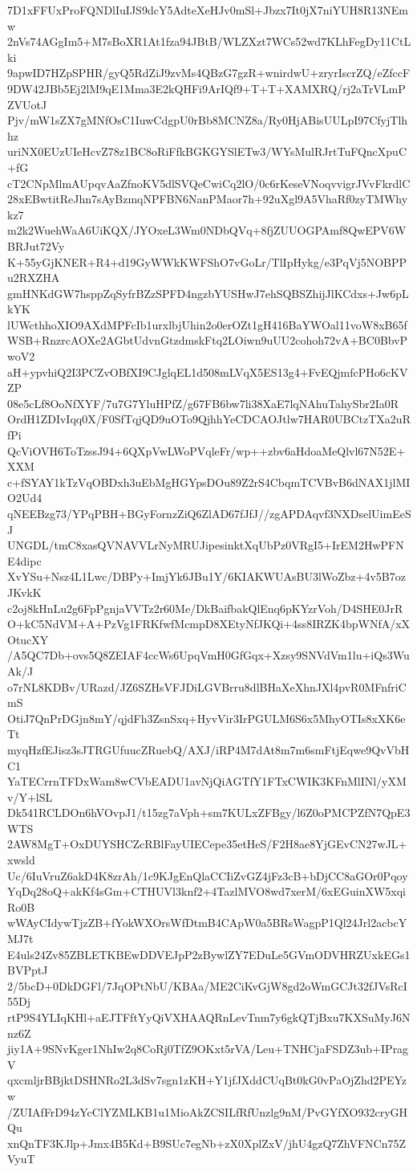 7D1xFFUxProFQNDlIuIJS9dcY5AdteXeHJv0mSl+Jbzx7It0jX7niYUH8R13NEmw
2nVs74AGgIm5+M7sBoXR1At1fza94JBtB/WLZXzt7WCs52wd7KLhFegDy11CtLki
9apwID7HZpSPHR/gyQ5RdZiJ9zvMs4QBzG7gzR+wnirdwU+zryrIscrZQ/eZfccF
9DW42JBb5Ej2lM9qE1Mma3E2kQHFi9ArIQf9+T+T+XAMXRQ/rj2aTrVLmPZVUotJ
Pjv/mW1sZX7gMNfOsC1IuwCdgpU0rBb8MCNZ8a/Ry0HjABisUULpI97CfyjTlhhz
uriNX0EUzUIeHcvZ78z1BC8oRiFfkBGKGYSlETw3/WYsMulRJrtTuFQncXpuC+fG
cT2CNpMlmAUpqvAaZfnoKV5dlSVQeCwiCq2lO/0c6rKeseVNoqvvigrJVvFkrdlC
28xEBwtitReJhn7sAyBzmqNPFBN6NanPMaor7h+92uXgl9A5VhaRf0zyTMWhykz7
m2k2WuehWaA6UiKQX/JYOxeL3Wm0NDbQVq+8fjZUUOGPAmf8QwEPV6WBRJut72Vy
K+55yGjKNER+R4+d19GyWWkKWFShO7vGoLr/TlIpHykg/e3PqVj5NOBPPu2RXZHA
gmHNKdGW7hsppZqSyfrBZzSPFD4ngzbYUSHwJ7ehSQBSZhijJlKCdxs+Jw6pLkYK
lUWcthhoXIO9AXdMPFcIb1urxlbjUhin2o0erOZt1gH416BaYWOal11voW8xB65f
WSB+RnzrcAOXe2AGbtUdvnGtzdmskFtq2LOiwn9uUU2cohoh72vA+BC0BbvPwoV2
aH+ypvhiQ2I3PCZvOBfXI9CJglqEL1d508mLVqX5ES13g4+FvEQjmfcPHo6cKVZP
08e5cLf8OoNfXYF/7u7G7YluHPfZ/g67FB6bw7li38XaE7lqNAhuTahySbr2Ia0R
OrdH1ZDIvIqq0X/F0SfTqjQD9uOTo9QjhhYeCDCAOJtlw7HAR0UBCtzTXa2uRfPi
QcViOVH6ToTzssJ94+6QXpVwLWoPVqleFr/wp++zbv6aHdoaMeQlvl67N52E+XXM
c+fSYAY1kTzVqOBDxh3uEbMgHGYpsDOu89Z2rS4CbqmTCVBvB6dNAX1jlMIO2Ud4
qNEEBzg73/YPqPBH+BGyFornzZiQ6ZlAD67fJfJ//zgAPDAqvf3NXDselUimEeSJ
UNGDL/tmC8xasQVNAVVLrNyMRUJipesinktXqUbPz0VRgI5+IrEM2HwPFNE4dipc
XvYSu+Nsz4L1Lwc/DBPy+ImjYk6JBu1Y/6KIAKWUAsBU3lWoZbz+4v5B7ozJKvkK
c2oj8kHnLu2g6FpPgnjaVVTz2r60Me/DkBaifbakQlEnq6pKYzrVoh/D4SHE0JrR
O+kC5NdVM+A+PzVg1FRKfwfMcmpD8XEtyNfJKQi+4ss8IRZK4bpWNfA/xXOtucXY
/A5QC7Db+ovs5Q8ZEIAF4ccWs6UpqVmH0GfGqx+Xzsy9SNVdVm1lu+iQs3WuAk/J
o7rNL8KDBv/URazd/JZ6SZHsVFJDiLGVBrru8dlBHaXeXhnJXl4pvR0MFnfriCmS
OtiJ7QnPrDGjn8mY/qjdFh3ZsnSxq+HyvVir3IrPGULM6S6x5MhyOTIs8xXK6eTt
myqHzfEJisz3sJTRGUfuucZRuebQ/AXJ/iRP4M7dAt8m7m6smFtjEqwe9QvVbHC1
YaTECrrnTFDxWam8wCVbEADU1avNjQiAGTfY1FTxCWIK3KFnMlINl/yXMv/Y+lSL
Dk541RCLDOn6hVOvpJ1/t15zg7aVph+sm7KULxZFBgy/l6Z0oPMCPZfN7QpE3WTS
2AW8MgT+OxDUYSHCZcRBlFayUIECepe35etHeS/F2H8ae8YjGEvCN27wJL+xwsld
Uc/6IuVruZ6akD4K8zrAh/1c9KJgEnQlaCCIiZvGZ4jFz3cB+bDjCC8aGOr0Pqoy
YqDq28oQ+akKf4sGm+CTHUVl3knf2+4TazlMVO8wd7xerM/6xEGuinXW5xqiRo0B
wWAyCIdywTjzZB+fYokWXOrsWfDtmB4CApW0a5BRsWagpP1Ql24Jrl2acbcYMJ7t
E4uls24Zv85ZBLETKBEwDDVEJpP2zBywlZY7EDuLe5GVmODVHRZUxkEGs1BVPptJ
2/5bcD+0DkDGFl/7JqOPtNbU/KBAa/ME2CiKvGjW8gd2oWmGCJt32fJVsRcI55Dj
rtP9S4YLIqKHl+aEJTFftYyQiVXHAAQRnLevTnm7y6gkQTjBxu7KXSuMyJ6Nnz6Z
jiy1A+9SNvKger1NhIw2q8CoRj0TfZ9OKxt5rVA/Leu+TNHCjaFSDZ3ub+IPragV
qxcmljrBBjktDSHNRo2L3dSv7sgn1zKH+Y1jfJXddCUqBt0kG0vPaOjZhd2PEYzw
/ZUIAfFrD94zYcClYZMLKB1u1MioAkZCSILfRfUnzlg9nM/PvGYfXO932cryGHQu
xnQnTF3KJlp+Jmx4B5Kd+B9SUc7egNb+zX0XplZxV/jhU4gzQ7ZhVFNCn75ZVyuT
